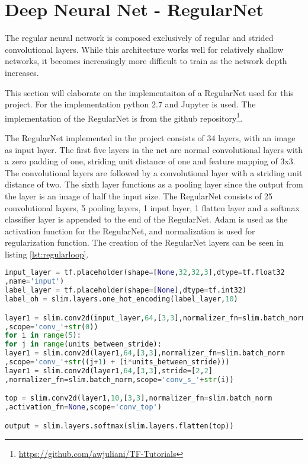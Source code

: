 \section{Deep Neural Net - RegularNet}
The regular neural network is composed exclusively of regular and strided convolutional layers. While this architecture works well for relatively shallow networks, it becomes increasingly more difficult to train as the network depth increases.

This section will elaborate on the implementaiton of a RegularNet used for this project. For the implementation python 2.7 and Jupyter is used. The implementation of the RegularNet is from the github repository\footnote{\url{https://github.com/awjuliani/TF-Tutorials}}. 

The RegularNet implemented in the project consists of 34 layers, with an image as input layer. The first five layers in the net are normal convolutional layers with a zero padding of one, striding unit distance of one and feature mapping of 3x3. The convolutional layers are followed by a convolutional layer with a striding unit distance of two. The sixth layer functions as a pooling layer since the output from the layer is an image of half the input size. The RegularNet consists of 25 convolutional layers, 5 pooling layers, 1 input layer, 1 flatten layer and a softmax classifier layer is appended to the end of the RegularNet. Adam is used as the activation function for the RegularNet, and normalization is used for regularization function. The creation of the RegularNet layers can be seen in listing \ref{lst:regularloop}.

\begin{lstlisting}[language=Python, label=lst:regularloop, caption=For loop that creates the layers in the RegularNet]
input_layer = tf.placeholder(shape=[None,32,32,3],dtype=tf.float32
,name='input')
label_layer = tf.placeholder(shape=[None],dtype=tf.int32)
label_oh = slim.layers.one_hot_encoding(label_layer,10)

layer1 = slim.conv2d(input_layer,64,[3,3],normalizer_fn=slim.batch_norm
,scope='conv_'+str(0))
for i in range(5):
for j in range(units_between_stride):
layer1 = slim.conv2d(layer1,64,[3,3],normalizer_fn=slim.batch_norm
,scope='conv_'+str((j+1) + (i*units_between_stride)))
layer1 = slim.conv2d(layer1,64,[3,3],stride=[2,2]
,normalizer_fn=slim.batch_norm,scope='conv_s_'+str(i))

top = slim.conv2d(layer1,10,[3,3],normalizer_fn=slim.batch_norm
,activation_fn=None,scope='conv_top')

output = slim.layers.softmax(slim.layers.flatten(top))
\end{lstlisting}

